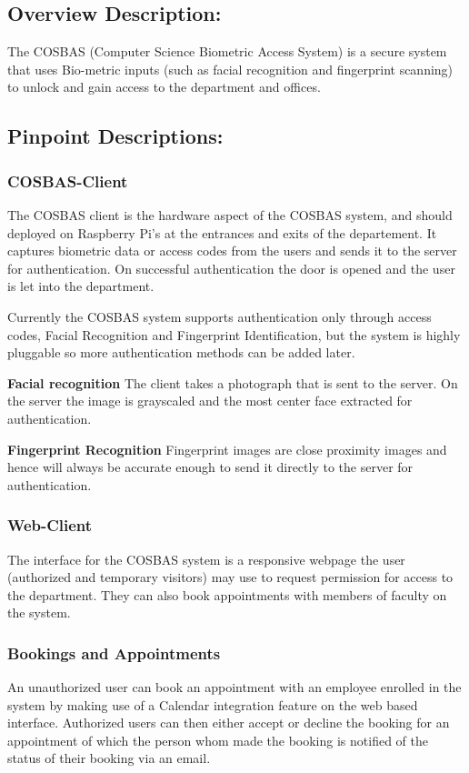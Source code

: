 \subsection{Overview Description:}
	The COSBAS (Computer Science Biometric Access System) is a secure system that uses Bio-metric inputs (such as facial recognition and fingerprint scanning) to unlock and gain access to the department and offices.
	
\subsection{Pinpoint Descriptions:}
	\subsubsection{COSBAS-Client}
	The COSBAS client is the hardware aspect of the COSBAS system, and should deployed on  Raspberry Pi's at the entrances and exits of the departement.  It captures biometric data or access codes from the users and sends it to the server for authentication. On successful authentication the door is opened and the user is let into the department. 
	
	Currently the COSBAS system supports authentication only through access codes, Facial Recognition and Fingerprint Identification, but the system is highly pluggable so more  authentication methods can be added later. 
	
	\textbf{Facial recognition}
	The client takes a photograph that is sent to the server. On the server the image is grayscaled and the most center face extracted for authentication. 
	
	\textbf{Fingerprint Recognition}
	Fingerprint images are close proximity images and hence will always be accurate enough to send it directly to the server for authentication.
	
	\subsubsection{Web-Client}
	The interface for the COSBAS system is a responsive webpage the user (authorized and temporary visitors) may use to request permission for access to the department. They can also book appointments with members of faculty on the system.
	
	\subsubsection{Bookings and Appointments}
	An unauthorized user can book an appointment with an employee enrolled in the system by making use of a Calendar integration feature on the web based interface. Authorized users can then either accept or decline the booking for an appointment of which the person whom made the booking is notified of the status of their booking via an email.
	
